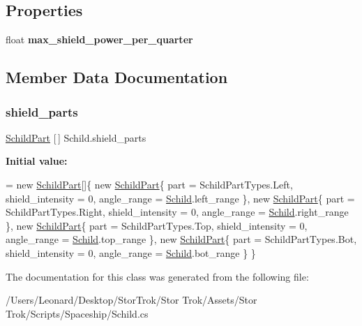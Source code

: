 \subsection*{Properties}
\begin{DoxyCompactItemize}
\item 
\mbox{\label{class_schild_a063dc74127ed6aeb9b723331208d46ac}} 
float {\bfseries max\+\_\+shield\+\_\+power\+\_\+per\+\_\+quarter}
\end{DoxyCompactItemize}


\subsection{Member Data Documentation}
\mbox{\label{class_schild_a17c1d5d5d3d4cb1247b9705d69529acc}} 
\subsubsection{\texorpdfstring{shield\+\_\+parts}{shield\_parts}}
{\footnotesize\ttfamily \hyperlink{class_schild_part}{Schild\+Part} \mbox{[}$\,$\mbox{]} Schild.\+shield\+\_\+parts}

{\bfseries Initial value\+:}
\begin{DoxyCode}
= \textcolor{keyword}{new} \hyperlink{class_schild_part}{SchildPart}[]\{
        \textcolor{keyword}{new} \hyperlink{class_schild_part}{SchildPart}\{
            part = SchildPartTypes.Left,
            shield\_intensity = 0,
            angle\_range = \hyperlink{class_schild}{Schild}.left\_range
        \},
        \textcolor{keyword}{new} \hyperlink{class_schild_part}{SchildPart}\{
            part = SchildPartTypes.Right,
            shield\_intensity = 0,
            angle\_range = \hyperlink{class_schild}{Schild}.right\_range
        \},
        \textcolor{keyword}{new} \hyperlink{class_schild_part}{SchildPart}\{
            part = SchildPartTypes.Top,
            shield\_intensity = 0,
            angle\_range = \hyperlink{class_schild}{Schild}.top\_range
        \},
        \textcolor{keyword}{new} \hyperlink{class_schild_part}{SchildPart}\{
            part = SchildPartTypes.Bot,
            shield\_intensity = 0,
            angle\_range = \hyperlink{class_schild}{Schild}.bot\_range
        \}
    \}
\end{DoxyCode}


The documentation for this class was generated from the following file\+:\begin{DoxyCompactItemize}
\item 
/\+Users/\+Leonard/\+Desktop/\+Stor\+Trok/\+Stor Trok/\+Assets/\+Stor Trok/\+Scripts/\+Spaceship/Schild.\+cs\end{DoxyCompactItemize}
